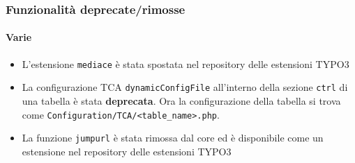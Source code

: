 
\begin{frame}[fragile]
	\frametitle{Funzionalità deprecate/rimosse}
	\framesubtitle{Varie}

	\begin{itemize}

		\item L'estensione \texttt{mediace} è stata spostata nel repository delle estensioni TYPO3

		\item La configurazione TCA \texttt{dynamicConfigFile} all'interno della sezione \texttt{ctrl} di
			una tabella è stata \textbf{deprecata}.
			Ora la configurazione della tabella si trova come \texttt{Configuration/TCA/<table\_name>.php}.

		\item La funzione \texttt{jumpurl} è stata rimossa dal core ed è disponibile 
			come un estensione nel repository delle estensioni TYPO3

	\end{itemize}

\end{frame}

